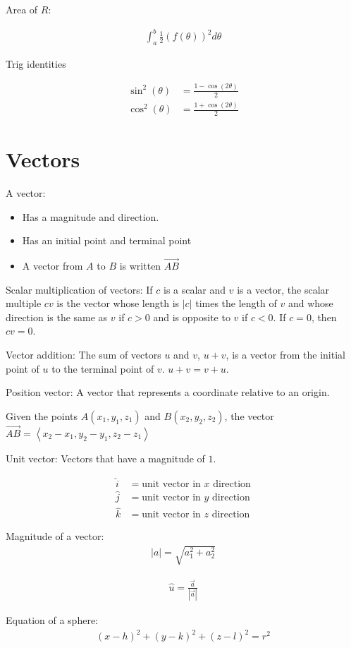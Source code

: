 \documentclass{article}
\begin{document}
Area of $R$:

\begin{gather*}
    \int_a^b \frac{1}{2}(f(\theta))^2 d\theta
\end{gather*}

Trig identities

\begin{align*}
    \sin^2(\theta) &= \frac{1-\cos(2\theta)}{2} \\
    \cos^2(\theta) &= \frac{1+\cos(2\theta)}{2}
\end{align*}

\section{Vectors}

A vector:
\begin{itemize}
    \item Has a magnitude and direction.
    \item Has an initial point and terminal point
    \item A vector from $A$ to $B$ is written $\overrightarrow{AB}$
\end{itemize}

Scalar multiplication of vectors: If $c$ is a scalar and $v$ is a vector, the scalar multiple $cv$ is the vector whose length is $|c|$ times the length of $v$ and whose direction is the same as $v$ if $c > 0$ and is opposite to $v$ if $c<0$. If $c=0$, then $cv=0$.

Vector addition: The sum of vectors $u$ and $v$, $u+v$, is a vector from the initial point of $u$ to the terminal point of $v$. $u + v = v + u$.

Position vector: A vector that represents a coordinate relative to an origin.

Given the points $A(x_1, y_1, z_1)$ and $B(x_2, y_2, z_2)$, the vector $\overrightarrow{AB} = \left\langle x_2 - x_1, y_2 - y_1, z_2 - z_1 \right\rangle$

Unit vector: Vectors that have a magnitude of $1$.

\begin{align*}
    \hat{i} &= \text{unit vector in $x$ direction} \\
    \hat{j} &= \text{unit vector in $y$ direction} \\
    \hat{k} &= \text{unit vector in $z$ direction}
\end{align*}

Magnitude of a vector:
\begin{gather*}
    |a| = \sqrt{a_1^2 + a_2^2}
\end{gather*}

\begin{gather*}
    \hat{u} = \frac{\overrightarrow{a}}{|\overrightarrow{a}|}
\end{gather*}

Equation of a sphere:
\begin{gather*}
    (x-h)^2 + (y-k)^2 + (z-l)^2 = r^2
\end{gather*}
\end{document}
